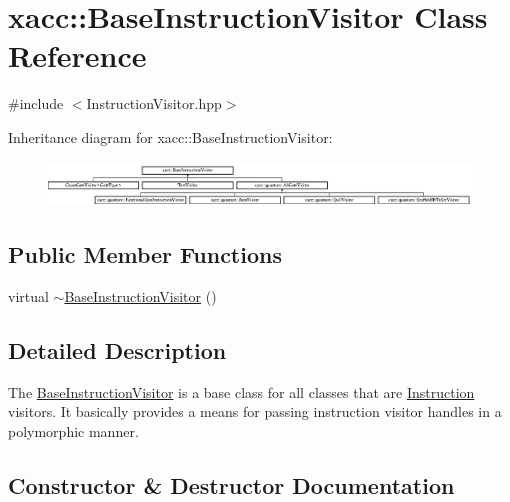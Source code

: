 \hypertarget{a01136}{}\section{xacc\+:\+:Base\+Instruction\+Visitor Class Reference}
\label{a01136}


{\ttfamily \#include $<$Instruction\+Visitor.\+hpp$>$}

Inheritance diagram for xacc\+:\+:Base\+Instruction\+Visitor\+:\begin{figure}[H]
\begin{center}
\leavevmode
\includegraphics[height=1.183099cm]{a01136}
\end{center}
\end{figure}
\subsection*{Public Member Functions}
\begin{DoxyCompactItemize}
\item 
virtual \hyperlink{a01136_aa6f5104f5868fe1eca9be4dc4036eba4}{$\sim$\+Base\+Instruction\+Visitor} ()
\end{DoxyCompactItemize}


\subsection{Detailed Description}
The \hyperlink{a01136}{Base\+Instruction\+Visitor} is a base class for all classes that are \hyperlink{a01128}{Instruction} visitors. It basically provides a means for passing instruction visitor handles in a polymorphic manner. 

\subsection{Constructor \& Destructor Documentation}
\mbox{\label{a01136_aa6f5104f5868fe1eca9be4dc4036eba4}} 
